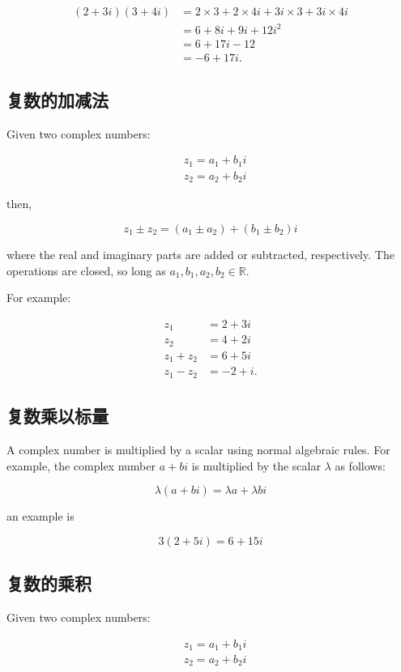 $$
\begin{aligned}
(2+3 i)(3+4 i) & =2 \times 3+2 \times 4 i+3 i \times 3+3 i \times 4 i \\
& =6+8 i+9 i+12 i^{2} \\
& =6+17 i-12 \\
& =-6+17 i .
\end{aligned}
$$

\subsection{复数的加减法}
Given two complex numbers:

$$
\begin{aligned}
& z_{1}=a_{1}+b_{1} i \\
& z_{2}=a_{2}+b_{2} i
\end{aligned}
$$

then,

$$
z_{1} \pm z_{2}=\left(a_{1} \pm a_{2}\right)+\left(b_{1} \pm b_{2}\right) i
$$

where the real and imaginary parts are added or subtracted, respectively. The operations are closed, so long as $a_{1}, b_{1}, a_{2}, b_{2} \in \mathbb{R}$.

For example:

$$
\begin{aligned}
z_{1} & =2+3 i \\
z_{2} & =4+2 i \\
z_{1}+z_{2} & =6+5 i \\
z_{1}-z_{2} & =-2+i .
\end{aligned}
$$

\subsection{复数乘以标量}
A complex number is multiplied by a scalar using normal algebraic rules. For example, the complex number $a+b i$ is multiplied by the scalar $\lambda$ as follows:

$$
\lambda(a+b i)=\lambda a+\lambda b i
$$

an example is

$$
3(2+5 i)=6+15 i
$$

\subsection{复数的乘积}
Given two complex numbers:

$$
\begin{aligned}
& z_{1}=a_{1}+b_{1} i \\
& z_{2}=a_{2}+b_{2} i
\end{aligned}
$$

